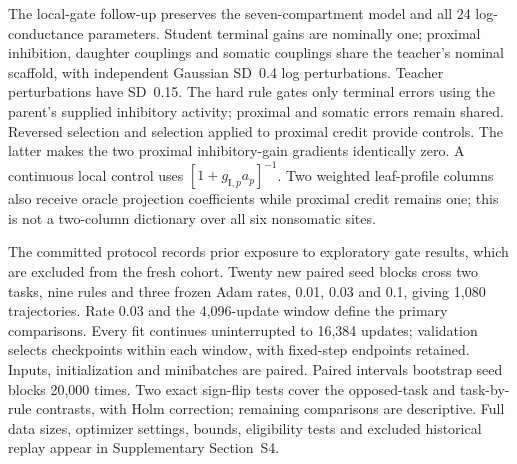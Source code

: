 The local-gate follow-up preserves the seven-compartment model and all 24 log-conductance parameters. Student terminal gains are nominally one; proximal inhibition, daughter couplings and somatic couplings share the teacher's nominal scaffold, with independent Gaussian SD~0.4 log perturbations. Teacher perturbations have SD~0.15. The hard rule gates only terminal errors using the parent's supplied inhibitory activity; proximal and somatic errors remain shared. Reversed selection and selection applied to proximal credit provide controls. The latter makes the two proximal inhibitory-gain gradients identically zero. A continuous local control uses $[1+g_{\mathrm I,p}a_p]^{-1}$. Two weighted leaf-profile columns also receive oracle projection coefficients while proximal credit remains one; this is not a two-column dictionary over all six nonsomatic sites.

The committed protocol records prior exposure to exploratory gate results, which are excluded from the fresh cohort. Twenty new paired seed blocks cross two tasks, nine rules and three frozen Adam rates, 0.01, 0.03 and 0.1, giving 1,080 trajectories. Rate 0.03 and the 4,096-update window define the primary comparisons. Every fit continues uninterrupted to 16,384 updates; validation selects checkpoints within each window, with fixed-step endpoints retained. Inputs, initialization and minibatches are paired. Paired intervals bootstrap seed blocks 20,000 times. Two exact sign-flip tests cover the opposed-task and task-by-rule contrasts, with Holm correction; remaining comparisons are descriptive. Full data sizes, optimizer settings, bounds, eligibility tests and excluded historical replay appear in Supplementary Section~S4.
